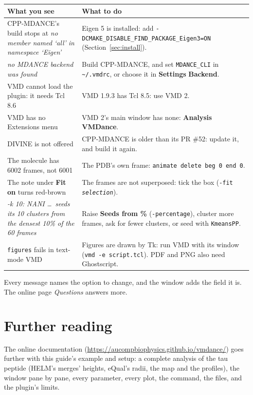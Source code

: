 \documentclass[11pt,letterpaper]{article}
\newcommand{\ui}[1]{\textsf{\textbf{#1}}}
\newcommand{\then}{\,\raisebox{0.15ex}{\scalebox{0.6}{$\blacktriangleright$}}\,}
\newcommand{\cmd}[1]{\texttt{#1}}
\newcommand{\meta}[1]{\textrm{\emph{#1}}}
\begin{document}
\begin{center}
\small
\begin{tabularx}{\textwidth}{@{}p{}L@{}}
\toprule
\textbf{What you see} & \textbf{What to do} \\
\midrule
CPP-MDANCE's build stops at \emph{no member named `all' in namespace `Eigen'}
  & Eigen 5 is installed: add \cmd{-DCMAKE\_DISABLE\_FIND\_PACKAGE\_Eigen3=ON}
  (Section~\ref{sec:install}). \\
\addlinespace
\emph{no MDANCE backend was found} & Build CPP-MDANCE, and set
  \cmd{MDANCE\_CLI} in \cmd{\textasciitilde/.vmdrc}, or choose it in
  \ui{Settings}\then\ui{Backend}. \\
\addlinespace
VMD cannot load the plugin: it needs Tcl 8.6 & VMD 1.9.3 has Tcl 8.5: use VMD 2. \\
\addlinespace
VMD has no Extensions menu & VMD 2's main window has none: \ui{Analysis}\then\ui{VMDance}. \\
\addlinespace
DIVINE is not offered & CPP-MDANCE is older than its PR \#52: update it, and build it again. \\
\addlinespace
The molecule has 6002 frames, not 6001 & The PDB's own frame:
  \cmd{animate delete beg 0 end 0}. \\
\addlinespace
The note under \ui{Fit on} turns red-brown & The frames are not
  superposed: tick the box (\cmd{-fit \meta{selection}}). \\
\addlinespace
\emph{-k 10: NANI \ldots\ seeds its 10 clusters from the densest 10\% of the 60 frames}
  & Raise \ui{Seeds from \%} (\cmd{-percentage}), cluster more frames, ask for
  fewer clusters, or seed with \cmd{KmeansPP}. \\
\addlinespace
\cmd{figures} fails in text-mode VMD & Figures are drawn by Tk: run VMD with
  its window (\cmd{vmd -e script.tcl}). PDF and PNG also need Ghostscript. \\
\bottomrule
\end{tabularx}
\end{center}

Every message names the option to change, and the window adds the field it
is. The online page \emph{Questions} answers more.

\section{Further reading}

The online documentation (\url{https://aucompbiophysics.github.io/vmdance/})
goes further with this guide's example and setup: a complete analysis of
the tau peptide (HELM's merges' heights, eQual's radii, the map and the
profiles), the window pane by pane, every parameter, every plot, the
command, the files, and the plugin's limits.
\end{document}
